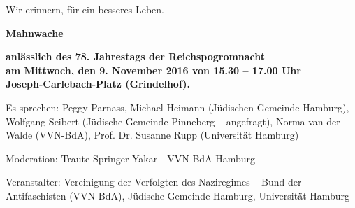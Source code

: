 \documentclass[ngerman,headheight=70pt]{scrartcl}
\begin{document}
    Wir erinnern, für ein besseres Leben.

    {\centering

    \textbf{Mahnwache}

    \textbf{anlässlich des 78. Jahrestags der Reichspogromnacht \\
    am Mittwoch, den 9. November 2016 von 15.30 – 17.00 Uhr \\
    Joseph-Carlebach-Platz (Grindelhof).}\\}
    \vspace{0.3cm}

    Es sprechen: Peggy Parnass, Michael Heimann (Jüdischen Gemeinde Hamburg),
    Wolfgang Seibert (Jüdische Gemeinde Pinneberg – angefragt), Norma van der
    Walde (VVN-BdA), Prof. Dr. Susanne Rupp (Universität Hamburg)

    Moderation: Traute Springer-Yakar - VVN-BdA Hamburg

    Veranstalter: Vereinigung der Verfolgten des Naziregimes – Bund der
    Antifaschisten (VVN-BdA), Jüdische Gemeinde Hamburg, Universität Hamburg
\end{document}
